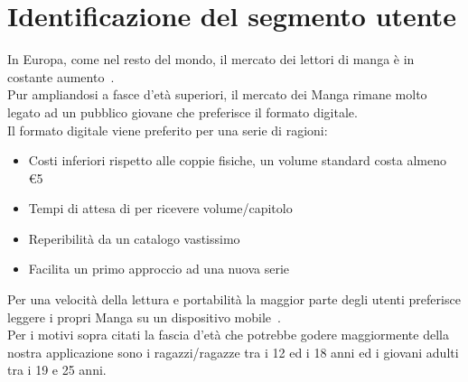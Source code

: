 \documentclass[../Assignment-3-LPSMT.tex]{subfiles}
\begin{document}
\chapter{Identificazione del segmento utente}

In Europa, come nel resto del mondo, il mercato dei lettori di manga è
in costante aumento~\cite{mangaOut}.\\
Pur ampliandosi a fasce d'età superiori, il mercato dei Manga rimane
molto legato ad un pubblico giovane che preferisce il formato digitale.\\
Il formato digitale viene preferito per una serie di ragioni:

\begin{itemize}
	\item Costi inferiori rispetto alle coppie fisiche, un volume standard costa almeno \euro{5}
	\item Tempi di attesa di per ricevere volume/capitolo
	\item Reperibilità da un catalogo vastissimo
	\item Facilita un primo approccio ad una nuova serie
\end{itemize}

Per una velocità della lettura e portabilità la maggior parte degli utenti preferisce leggere i propri Manga su un dispositivo mobile~\cite{NLTreport}.\\
Per i motivi sopra citati la fascia d'età che potrebbe godere maggiormente della nostra applicazione sono i ragazzi/ragazze tra i 12 ed i 18 anni ed i giovani adulti tra i 19 e 25 anni.
\end{document}
